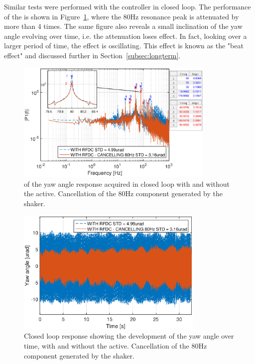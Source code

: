 Similar tests were performed with the controller in closed loop. The performance of the \abbrRFDC is shown in Figure~\ref{fig:fft_closedloop_80}, where the 80Hz resonance peak is attenuated by more than 4 times. The same figure also reveals a small inclination of the yaw angle evolving over time, i.e. the attenuation loses effect. In fact, looking over a larger period of time, the effect is oscillating. This effect is known as the "beat effect" and discussed further in Section~\ref{subsec:longterm}.

\begin{figure}[h]
  \centering %
  \includegraphics[width=0.85\textwidth]{fig/matlab/fft_closedloop_ext_disturbance_80Hz_with_zoom_2}
  \caption{\label{fig:fft_closedloop_80} \abbrFFT of the yaw angle response acquired in closed loop with and without the \abbrRFDC active. Cancellation of the 80Hz component generated by the shaker.}
\end{figure}

\begin{figure}[h]
  \centering %
  \includegraphics[width=0.8\textwidth]{fig/matlab/yl_closedloop_ext_disturbance_80Hz_2}
  \caption{\label{fig:yl_closedloop_80} Closed loop response showing the development of the yaw angle over time, with and without the \abbrRFDC active. Cancellation of the 80Hz component generated by the shaker.}
\end{figure}


